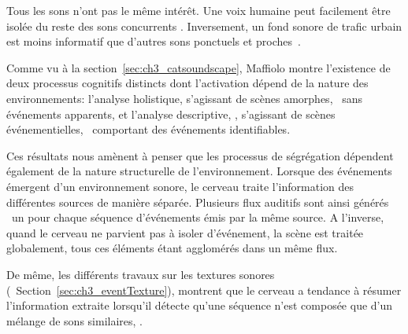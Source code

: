 Tous les sons n'ont pas le même intérêt. Une voix humaine peut facilement être isolée du reste des sons concurrents \citep{carlyon2004brain}. Inversement, un fond sonore de trafic urbain est moins informatif que d'autres sons ponctuels et proches~\citep{southworth1969sonic}.

Comme vu à la section~\ref{sec:ch3_catsoundscape}, Maffiolo montre l'existence de deux processus cognitifs distincts dont l'activation dépend de la nature des environnements: l'analyse holistique, s'agissant de scènes amorphes, \ie~sans événements apparents, et l'analyse descriptive,  , s'agissant de scènes événementielles, \ie~comportant des événements identifiables.

Ces résultats nous amènent à penser que les processus de ségrégation dépendent également de la nature structurelle de l'environnement. Lorsque des événements émergent d'un environnement sonore, le cerveau traite l'information des différentes sources de manière séparée. Plusieurs flux auditifs sont ainsi générés \ie~un pour chaque séquence d'événements émis par la même source. A l'inverse, quand le cerveau ne parvient pas à isoler d'événement, la scène est traitée globalement, tous ces éléments étant agglomérés dans un même flux. 

De même, les différents travaux sur les textures sonores (\cf~Section~\ref{sec:ch3_eventTexture}), montrent que le cerveau a tendance à résumer l'information extraite lorsqu'il détecte qu'une séquence n'est composée que d'un mélange de sons similaires,  . 

